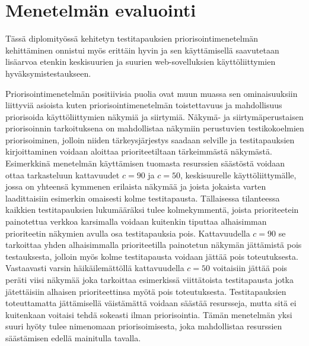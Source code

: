 \section{Menetelmän evaluointi} \label{ch:12_menetelman_evaluointi}

  Tässä diplomityössä kehitetyn testitapauksien priorisointimenetelmän kehittäminen onnistui myös erittäin hyvin ja sen käyttämisellä saavutetaan lisäarvoa etenkin keskisuurien ja suurien web-sovelluksien käyttöliittymien hyväksymistestaukseen.

  Priorisointimenetelmän positiivisia puolia ovat muun muassa sen ominaisuuksiin liittyviä asioista kuten priorisointimenetelmän toistettavuus ja mahdollisuus priorisoida käyttöliittymien näkymiä ja siirtymiä.
  Näkymä- ja siirtymäperustaisen priorisoinnin tarkoituksena on mahdollistaa näkymiin perustuvien testikokoelmien priorisoiminen, jolloin niiden tärkeysjärjestys saadaan selville ja testitapauksien kirjoittaminen voidaan aloittaa prioriteetiltaan tärkeimmästä näkymästä.
  Esimerkkinä menetelmän käyttämisen tuomasta resurssien säästöstä voidaan ottaa tarkasteluun kattavuudet \(c=90\) ja \(c=50\), keskisuurelle käyttöliittymälle, jossa on yhteensä kymmenen erilaista näkymää ja joista jokaista varten laadittaisiin esimerkin omaisesti kolme testitapausta.
  Tällaisessa tilanteessa kaikkien testitapauksien lukumääräksi tulee kolmekymmentä, joista prioriteetein painotettua verkkoa karsimalla voidaan kuitenkin tiputtaa alhaisimman prioriteetin näkymien avulla osa testitapauksia pois.
  Kattavuudella \(c=90\) se tarkoittaa yhden alhaisimmalla prioriteetilla painotetun näkymän jättämistä pois testauksesta, jolloin myös kolme testitapausta voidaan jättää pois toteutuksesta.
  Vastaavasti varsin häikäilemättöllä kattavuudella \(c=50\) voitaisiin jättää pois peräti viisi näkymää joka tarkoittaa esimerkissä viittätoista testitapausta jotka jätettäisiin alhaisen prioriteettinsa myötä pois toteutuksesta.
  Testitapauksien toteuttamatta jättämisellä väistämättä voidaan säästää resursseja, mutta sitä ei kuitenkaan voitaisi tehdä sokeasti ilman priorisointia.
  Tämän menetelmän yksi suuri hyöty tulee nimenomaan priorisoimisesta, joka mahdollistaa resurssien säästämisen edellä mainitulla tavalla.

